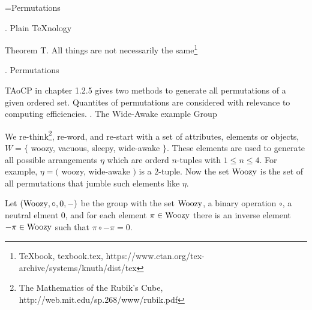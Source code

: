 
\def\a{\left(\matrix }
\def\b{\cr}
\def\c{\right)}

\def\d{\footnote*{The Mathematics of the Rubik’s Cube,
  http://web.mit.edu/sp.268/www/rubik.pdf}}
\def\f{\footnote*{TAoCP chapter 1.2.5,
  https://www-cs-faculty.stanford.edu/\%7Eknuth/taocp.html}}
\def\g{\footnote*{\TeX book, texbook.tex,
  https://www.ctan.org/tex-archive/systems/knuth/dist/tex}}
\def\gg{\footnote*{https://books.google.co.uk/books?id=\%5fn1vr0\%5fRbXoC\&lpg=PA786\&pg=PA786}}
%
\def\e{\bigskip}
\def\R{\hbox{Woozy}}
\def\*{\circ}
%
\vsize=300pt %
\hsize=480pt %

\footline={\tenrm Permutations\quad\dotfill\quad \folio}
\raggedright

. Plain \TeX nology %

\proclaim Theorem T. All things are not necessarily the same\g

\def\strutdepth{\dp\strutbox}
\def\marginalstar{\strut\vadjust{\kern-\strutdepth\specialstar}}
\def\specialstar{\vtop to \strutdepth{
  \baselineskip\strutdepth
  \vss\llap{* }\null}}

. Permutations

\e
TAoCP in chapter 1.2.5 gives two methods to generate
all permutations of a given ordered set.
Quantites of permutations are considered
with relevance to computing efficiencies.
. The Wide-Awake example Group

\e
We re-think\d, re-word, and re-start
with a set of attributes, elements or objects,\break
$W=\{$ woozy, vacuous, sleepy, wide-awake $\}.$
These elements are used to generate all possible
arrangements $\eta$ which are orderd $n$-tuples with
$1\le n\le4.$
For example, $\eta=($ woozy, wide-awake $)$ is a $2$-tuple.
Now the set $\R$ is the set of all permutations that jumble
such elements like $\eta.$

\e
Let $(\R,\*,0,-)$ be the group with the set $\R$, a binary
operation $\*$, a neutral elment $0$, and
for each element $\pi\in\R$ there is an inverse element
$-\pi\in\R$ such that $\pi\*-\pi=0.$

